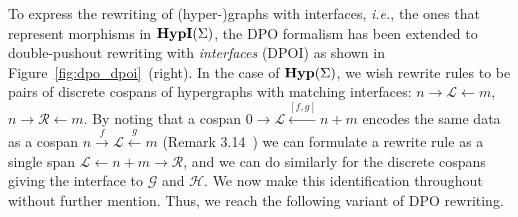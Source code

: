 To express the rewriting of (hyper-)graphs with interfaces,  \textit{i.e.},  the ones that represent morphisms in $\textbf{HypI}(\Sigma)$, the DPO formalism has been extended to double-pushout rewriting with \textit{interfaces}  (DPOI) as shown in Figure~\ref{fig:dpo_dpoi}~(right).
In the case of $ \mathbf{Hyp}(\Sigma)$,  we wish rewrite rules to be pairs of discrete cospans of hypergraphs with matching interfaces: $n \xrightarrow{} \mathcal L \xleftarrow{} m$, $n \xrightarrow{} \mathcal R \xleftarrow{} m$.  
By noting that a cospan $0 \xrightarrow{} \mathcal L \xleftarrow{[f,g]} n + m$ encodes the same data as a cospan $n \xrightarrow{f} \mathcal L \xleftarrow{g} m$ (Remark 3.14~\cite{bonchi_string_2022-1}) we can formulate a rewrite rule as a single span $\mathcal L \xleftarrow{} n+m \xrightarrow{} \mathcal R$,  and we can do similarly for the discrete cospans giving the interface to $\mathcal G$ and $\mathcal H$.  
We now make this identification throughout without further mention.  
Thus, we reach the following variant of DPO rewriting.
